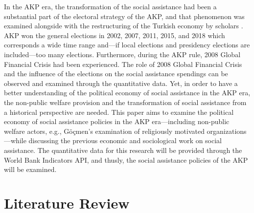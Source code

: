 \documentclass[11pt]{article}
\begin{document}
\noindent In the AKP era, the transformation of the social assistance had been a substantial part of the electoral strategy of the AKP, and that phenomenon was examined alongside with the restructuring of the Turkish economy by scholars \cite{buugra2006turkish, elveren2008social, yoruk2020electoral}. AKP won the general elections in 2002, 2007, 2011, 2015, and 2018 which corresponds a wide time range and—if local elections and presidency elections are included—too many elections. Furthermore, during the AKP rule, 2008 Global Financial Crisis had been experienced. The role of 2008 Global Financial Crisis and the influence of the elections on the social assistance spendings can be observed and examined through the quantitative data. Yet, in order to have a better understanding of the political economy of social assistance in the AKP era, the non-public welfare provision and the transformation of social assistance from a historical perspective are needed. This paper aims to examine the political economy of social assistance policies in the AKP era—including non-public welfare actors, e.g., Göçmen’s \cite{goccmen2014religion, goccmen2018non} examination of religiously motivated organizations—while discussing the previous economic and sociological work on social assistance. The quantitative data for this research will be provided through the World Bank Indicators API, and thusly, the social assistance policies of the AKP will be examined.

\section{Literature Review}
\end{document}

